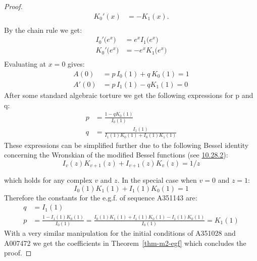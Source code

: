 \documentclass[a4paper]{amsart}
\begin{document}
\begin{proof}
\begin{equation}
\begin{aligned}
K_0'(x) &= -K_1(x). \\
\end{aligned}
\end{equation}
By the chain rule we get:
\begin{equation*}
    \begin{aligned}
        I_0'\bigl(e^x\bigr) &= e^xI_1\bigl(e^x\bigr) \\
        K_0'\bigl(e^x\bigr) &= -e^xK_1\bigl(e^x\bigr) \\
    \end{aligned}
\end{equation*}
Evaluating at $x=0$ gives:
\[
\begin{aligned}
A(0) & = p \,I_0(1)+q\,K_0(1) = 1 \\
A'(0) & = p\,I_1(1)-q K_1(1) = 0
\end{aligned}
\]
After some standard algebraic torture we get the following expressions for p and q:
\[
\begin{aligned}
p &= \frac{1-qK_0(1)}{I_0(1)} \\
q &= \frac{I_1(1)}{I_1(1)K_0(1)+I_0(1)K_1(1)}
\end{aligned}
\]
These expressions can be simplified further due to the following Bessel identity concerning the Wronskian of the modified Bessel functions (see \href{https://dlmf.nist.gov/10.28.E2}{10.28.2}):
\begin{equation}\label{eq-bessel-wronskian-general}
    I_v(z)K_{v+1}(z)+I_{v+1}(z)K_v(z) = 1/z
\end{equation}

which holds for any complex $v$ and $z$. In the special case when $v = 0$ and $z=1$:
\begin{equation}\label{eq-bessel-wronskian}
I_0(1)K_1(1)+I_1(1)K_0(1) = 1
\end{equation}
Therefore the constants for the e.g.f. of sequence A351143 are:
\[
\begin{aligned}
q &= I_1(1) \\
p &= \frac{1 - I_1(1)K_0(1)}{I_0(1)} = \frac{I_0(1)K_1(1)+I_1(1)K_0(1) - I_1(1)K_0(1)}{I_0(1)} = K_1(1)
\end{aligned}
\]
With a very similar manipulation for the initial conditions of A351028 and A007472 we get the coefficients in Theorem~\ref{thm-m2-egf} which concludes the proof.
\end{proof}
\end{document}
